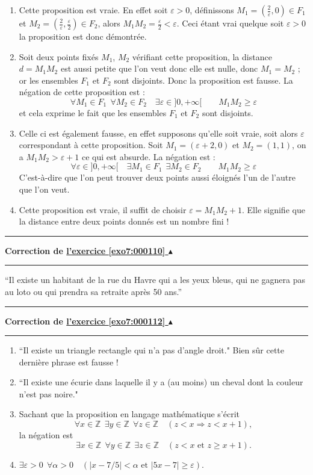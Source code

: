 \documentclass[11pt,a4paper]{article}
\newcommand{\Zz}{\mathbb{Z}} \newcommand{\Z}{\mathbb{Z}}
\renewcommand{\epsilon}{\varepsilon}
\newcounter{exo}
\newcommand{\correction}[1]{\hypertarget{cor7:#1}{}\label{cor7:#1}{\bf Correction de \hyperlink{exo7:#1}{l'exercice \ref{exo7:#1} $\blacktriangle$}}\vspace{1mm}\hrule\vspace{1mm}}
\newcommand{\fincorrection}{\vspace{1mm}\hrule\vspace*{7mm}}
\begin{document}
\begin{enumerate}
\item
 Cette proposition est vraie. En effet soit $\epsilon > 0$,  d\'efinissons $M_1 = (\frac{2}{\epsilon},0)  \in F_1$ et
 $M_2 = (\frac{2}{\epsilon},\frac{\epsilon}{2}) \in F_2$, alors $M_1M_2=\frac{\epsilon}{2} < \epsilon$. Ceci \'etant vrai quelque soit
$\epsilon >0$ la proposition est donc d\'emontr\'ee.


\item
Soit deux points fix\'es $M_1$, $M_2$ v\'erifiant cette
proposition, la distance $d= M_1M_2$ est
 aussi petite que l'on veut donc elle est nulle, donc $M_1 = M_2$ ; or les ensembles $F_1$ et $F_2$
sont disjoints. Donc la proposition est fausse. La n\'egation de
cette proposition est :
$$ \forall M_1 \in F_1 \ \  \forall M_2 \in F_2 \quad \exists \epsilon \in ]0,+\infty[ \quad  \quad M_1M_2 \geqslant \epsilon $$ et cela exprime le fait que les ensembles $F_1$ et $F_2$ sont disjoints.

\item
Celle ci est \'egalement fausse, en effet supposons qu'elle soit
vraie, soit alors $\epsilon$ correspondant \`a cette proposition.
Soit $M_1=(\epsilon +2,0)$ et $M_2 = (1,1)$, on a $M_1M_2 >
\epsilon+1$ ce qui est absurde. La n\'egation est :
$$\forall \epsilon \in ]0,+\infty[ \quad  \exists M_1 \in F_1 \ \  \exists M_2 \in F_2 \quad   \quad M_1M_2 \geqslant \epsilon $$
C'est-\`a-dire que l'on peut trouver deux points aussi
\'eloign\'es l'un de l'autre  que l'on veut.

\item
Cette proposition est vraie, il suffit de choisir
$\epsilon=M_1M_2+1$. Elle signifie que la distance entre deux
points donn\'es est un nombre fini !

\end{enumerate}
\fincorrection
\correction{000110}
``Il existe un habitant de la rue du Havre qui a les yeux bleus, qui
ne gagnera pas au loto ou qui prendra sa retraite apr\`es 50 ans.''
\fincorrection
\correction{000112}
\begin{enumerate}
    \item ``Il existe un triangle rectangle qui n'a pas d'angle droit." Bien sûr cette dernière phrase est fausse !
    \item ``Il existe une \'ecurie dans laquelle il y a (au moins) un cheval
dont la couleur n'est pas noire."
    \item Sachant que la proposition en langage math\'ematique s'\'ecrit
$$\forall x\in\Zz \ \  \exists y\in\Zz\ \  \forall z\in\Zz \quad (z<x \Rightarrow z<x+1),$$
la n\'egation est
$$\exists x\in\Zz\ \  \forall y\in\Zz\ \  \exists z\in\Zz \quad (z<x \text{ et } z\geq x+1).$$
    \item $\exists \epsilon>0\ \  \forall \alpha>0 \quad (|x-7/5|<\alpha \text{ et } |5x-7|\geq\epsilon).$
\end{enumerate}
\end{document}
